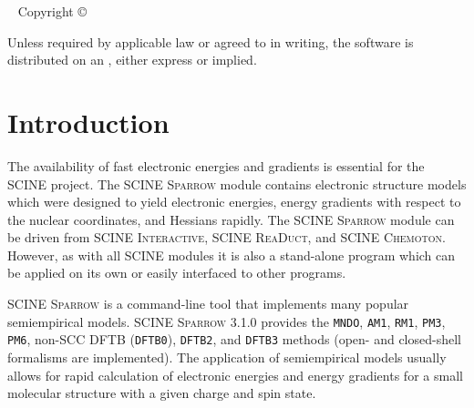 \documentclass[]{tufte-book}
\title[SCINE Sparrow manual]{User Manual \vskip 0.5em {\setlength{\parindent}{0pt} \Huge SCINE Sparrow 3.1.0}}
\author[The SCINE Sparrow Developers]{The SCINE Sparrow Developers: \newline \noindent Francesco Bosia, Tamara Husch, Charlotte H.~M\"uller, Severin Polonius, Jan-Grimo Sobez, Miguel Steiner, Jan P.~Unsleber, Alain C.~Vaucher, Thomas Weymuth, and Markus Reiher}
\newcommand{\monthyear}{%
  \ifcase\month\or January\or February\or March\or April\or May\or June\or
  July\or August\or September\or October\or November\or
  December\fi\space\number\year
}
\begin{document}
\setlength{\parindent}{0pt}

\frontmatter


\maketitle


\newpage
\begin{fullwidth}
~\vfill
\thispagestyle{empty}
\setlength{\parindent}{0pt}
\setlength{\parskip}{\baselineskip}
Copyright \copyright\ \the\year\ \thanklessauthor


\par{}

\par Unless required by applicable law or agreed to in writing, the software 
is distributed on an , either express or implied. 

\end{fullwidth}

\tableofcontents




\mainmatter

\let\cleardoublepage\clearpage
\chapter{Introduction}

The availability of fast electronic energies and gradients is essential for the SCINE project. The SCINE \textsc{Sparrow} 
module contains electronic structure models which were designed to yield electronic energies, energy gradients with 
respect to the nuclear coordinates, and Hessians rapidly. The SCINE \textsc{Sparrow} module can be driven from SCINE 
\textsc{Interactive}, SCINE \textsc{ReaDuct}, and SCINE \textsc{Chemoton}. However, as with all SCINE modules it is also 
a stand-alone program which can be applied on its own or easily interfaced to other programs.

SCINE \textsc{Sparrow} is a command-line tool that implements many popular semiempirical models. SCINE \textsc{Sparrow} 3.1.0
provides the \texttt{MNDO}, \texttt{AM1}, \texttt{RM1}, \texttt{PM3}, \texttt{PM6}, non-SCC DFTB (\texttt{DFTB0}), \texttt{DFTB2}, and \texttt{DFTB3} methods 
(open- and closed-shell formalisms are implemented). 
The application of semiempirical models usually allows for rapid calculation of electronic energies and energy gradients 
for a small molecular structure with a given charge and spin state.
\end{document}
